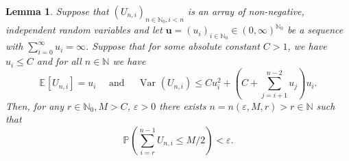 \documentclass[10pt,a4paper]{amsart}
\newtheorem{lem}{Lemma}
\newcommand{\E}[2][]{\ensuremath{\mathbb{E}_{#1}\left[#2 \right]}}
\newcommand{\Prob}[2][]{\ensuremath{\mathbb{P}_{#1} \left(#2 \right)}}
\newcommand{\Var}[2][]{\operatorname{Var}_{#1}\left(#2\right)}
\newcommand{\eps}{\varepsilon}
\begin{document}
\begin{lem} \label{lem:summands-diverge}
    Suppose that $(U_{n,i})_{n\in \mathbb{N}_0, i < n}$ is an array of non-negative, independent random variables and let $\boldsymbol{u} = (u_{i})_{i \in \mathbb{N}_0} \in (0, \infty)^{\mathbb{N}_0}$ be a sequence with $\sum_{i=0}^{\infty} u_i = \infty$. Suppose that for some absolute constant $C > 1$, we have $u_{i} \leq C$ and for all $n \in \mathbb{N}$ we have
    \begin{equation} \label{eq:variance-mean-bound}
        \E{U_{n,i}} = u_i \quad \text{ and } \quad \Var{U_{n,i}} \leq Cu_{i}^2 +  \left(C + \sum_{j=i+1}^{n-2} u_{j}\right)u_{i}. 
    \end{equation}
    Then, for any $r \in \mathbb{N}_0, M > C$, $\eps > 0$ there exists $n =  n(\eps, M, r) > r \in \mathbb{N}$ such that 
    \begin{equation} \label{eq:large-prob-to-be-large}
    \Prob{\sum_{i=r}^{n-1} U_{n,i} \leq M/2} < \eps. 
    \end{equation}
\end{lem}
\end{document}
